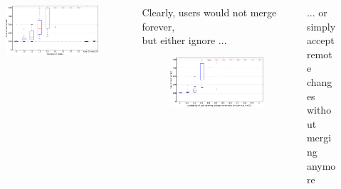 \documentclass[final,hyperref={pdfpagelabels=false}]{beamer}
\begin{document}
\begin{frame}
\begin{columns}
\begin{column}{.9\textwidth}
\begin{columns}
\begin{column}{.3\textwidth}
    \begin{figure}
      \includegraphics[width=\linewidth]{fig/dumb_sunset_n_scale_last.pdf}
    \end{figure}
  \end{column}
  \begin{column}{.3\textwidth}
    \begin{center}
    Clearly, users would not merge forever, \\
    but either ignore ...
    \end{center}
    \begin{figure}
      \includegraphics[width=\linewidth]{fig/bored_n=20.pdf}
    \end{figure}
  \end{column}
  \begin{column}{.3\textwidth}
    \begin{center}
    ... or simply accept remote changes \\
    without merging anymore
    \end{center}
    \begin{figure}

\end{figure}
\end{column}
\end{columns}
\end{column}
\end{columns}
\end{frame}
\end{document}
